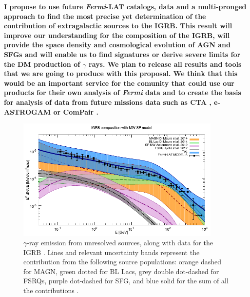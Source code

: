 \documentclass[12 pt]{article}
\begin{document}
{\bf I propose to use future {\it Fermi}-LAT catalogs, data and a multi-pronged approach to find the most precise yet determination of the contribution of extragalactic sources to the IGRB. This result will improve our understanding for the composition of the IGRB, will provide the space density and cosmological evolution of AGN and SFGs and will enable us to find signatures or derive severe limits for the DM production of $\gamma$ rays.
We plan to release all results and tools that we are going to produce with this proposal. 
We think that this would be an important service for the comunity that could use our products for their own analysis of {\it Fermi} data and to create the basis for analysis of data from future missions data such as CTA \cite{Ong:2017ihp}, e-ASTROGAM \cite{Tatischeff:2016ykb} or ComPair \cite{Moiseev:2015lva}.}


\begin{figure} %
   \centering
  \includegraphics[width=4.0in]{fluxcompart_2014_unr.pdf} 
   \caption{$\gamma$-ray emission from unresolved sources, along with 
data for the IGRB \cite{Ackermann:2014usa}. Lines and relevant uncertainty bands represent the contribution from the following source populations: orange dashed for MAGN,  green dotted for BL Lacs, grey double dot-dashed for FSRQs, purple dot-dashed for SFG, and blue solid for the sum of all the contributions \cite{DiMauro:2015tfa}.}
   \label{fig:igrbcomp}
\end{figure}
\end{document}
